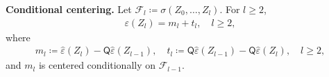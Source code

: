 \textbf{Conditional centering.} Let \(\mathcal{F}_l \coloneqq \sigma(Z_0, \dots, Z_l)\). For \(l \ge 2\),
\begin{equation}
\begin{aligned}
\varepsilon(Z_l)
  = m_l + t_l,
\quad l \ge 2,
\end{aligned}
\end{equation}
where
\begin{equation}
\begin{aligned}
m_l \coloneqq \widehat{\varepsilon}(Z_l) - \mathsf{Q} \widehat{\varepsilon}(Z_{l - 1}),
\quad
t_l \coloneqq \mathsf{Q} \widehat{\varepsilon}(Z_{l - 1}) - \mathsf{Q} \widehat{\varepsilon}(Z_l),
\quad l \ge 2,
\end{aligned}
\end{equation}
and \(m_l\) is centered conditionally on \(\mathcal{F}_{l - 1}\).


